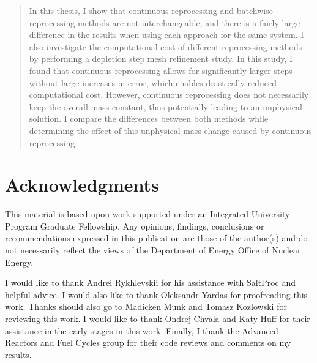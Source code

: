 \documentclass[edeposit,fullpage,hidelinks]{uiucthesis2018}
\begin{document}
\begin{abstract}
In this thesis, I show that continuous reprocessing and batchwise reprocessing methods are not interchangeable, and there is a fairly large difference in the results when using each approach for the same system.
I also investigate the computational cost of different reprocessing methods by performing a depletion step mesh refinement study.
In this study, I found that continuous reprocessing allows for significantly larger steps without large increases in error, which enables drastically reduced computational cost.
However, continuous reprocessing does not necessarily keep the overall mass constant, thus potentially leading to an unphysical solution.
I compare the differences between both methods while determining the effect of this unphysical mass change caused by continuous reprocessing.


\end{abstract}

\chapter*{Acknowledgments}

This material is based upon work supported under an Integrated University Program Graduate Fellowship.
Any opinions, findings, conclusions or recommendations expressed in this publication are
those of the author(s) and do not necessarily reflect the views of the Department of Energy
Office of Nuclear Energy.

I would like to thank Andrei Rykhlevskii for his assistance with SaltProc and helpful advice.
I would also like to thank Oleksandr Yardas for proofreading this work.
Thanks should also go to Madicken Munk and Tomasz Kozlowski for reviewing this work.
I would like to thank Ondrej Chvala and Katy Huff for their assistance in the early stages in this work.
Finally, I thank the Advanced Reactors and Fuel Cycles group for their code reviews and comments on my results.


\end{document}
